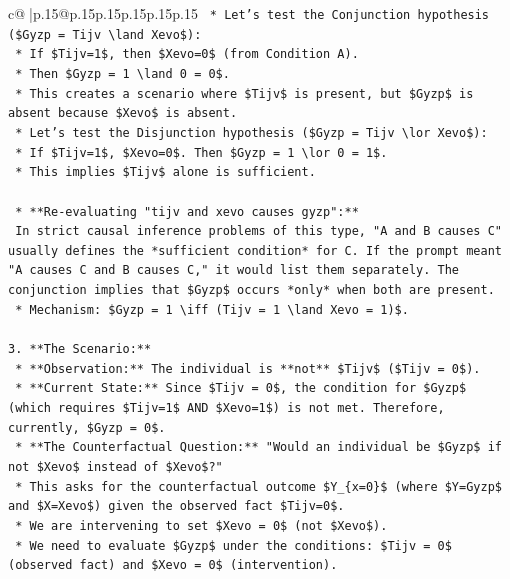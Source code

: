 \documentclass{article}
\begin{document}
{\begin{supertabular}{c@{$\;$}|p{.15\linewidth}@{}p{.15\linewidth}p{.15\linewidth}p{.15\linewidth}p{.15\linewidth}p{.15\linewidth}}
{{{\texttt{        *   Let's test the Conjunction hypothesis (\$Gyzp = Tijv \textbackslash{}land Xevo\$):} \\
\texttt{            *   If \$Tijv=1\$, then \$Xevo=0\$ (from Condition A).} \\
\texttt{            *   Then \$Gyzp = 1 \textbackslash{}land 0 = 0\$.} \\
\texttt{            *   This creates a scenario where \$Tijv\$ is present, but \$Gyzp\$ is absent because \$Xevo\$ is absent.} \\
\texttt{        *   Let's test the Disjunction hypothesis (\$Gyzp = Tijv \textbackslash{}lor Xevo\$):} \\
\texttt{            *   If \$Tijv=1\$, \$Xevo=0\$. Then \$Gyzp = 1 \textbackslash{}lor 0 = 1\$.} \\
\texttt{            *   This implies \$Tijv\$ alone is sufficient.} \\
\\ 
\texttt{    *   **Re{-}evaluating "tijv and xevo causes gyzp":**} \\
\texttt{        In strict causal inference problems of this type, "A and B causes C" usually defines the *sufficient condition* for C. If the prompt meant "A causes C and B causes C," it would list them separately. The conjunction implies that \$Gyzp\$ occurs *only* when both are present.} \\
\texttt{        *   Mechanism: \$Gyzp = 1 \textbackslash{}iff (Tijv = 1 \textbackslash{}land Xevo = 1)\$.} \\
\\ 
\texttt{3.  **The Scenario:**} \\
\texttt{    *   **Observation:** The individual is **not** \$Tijv\$ (\$Tijv = 0\$).} \\
\texttt{    *   **Current State:** Since \$Tijv = 0\$, the condition for \$Gyzp\$ (which requires \$Tijv=1\$ AND \$Xevo=1\$) is not met. Therefore, currently, \$Gyzp = 0\$.} \\
\texttt{    *   **The Counterfactual Question:** "Would an individual be \$Gyzp\$ if not \$Xevo\$ instead of \$Xevo\$?"} \\
\texttt{        *   This asks for the counterfactual outcome \$Y\_\{x=0\}\$ (where \$Y=Gyzp\$ and \$X=Xevo\$) given the observed fact \$Tijv=0\$.} \\
\texttt{        *   We are intervening to set \$Xevo = 0\$ (not \$Xevo\$).} \\
\texttt{        *   We need to evaluate \$Gyzp\$ under the conditions: \$Tijv = 0\$ (observed fact) and \$Xevo = 0\$ (intervention).} \\
}}}
\end{supertabular}}
\end{document}
